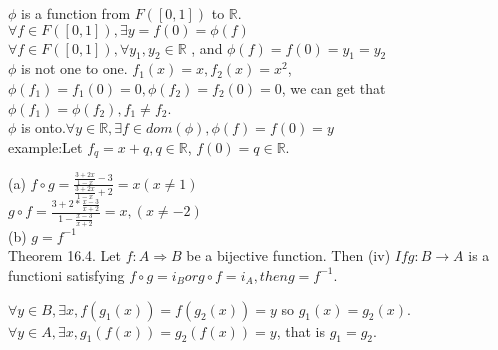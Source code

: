 \documentclass[a4paper, justified]{tufte-handout}
\begin{document}
\begin{problem}[UD Problem 15.15]
\end{problem}

\begin{solution}
	$\phi$ is a function from $F([0, 1])$ to $\mathbb{R}$.\\
	$\forall f \in F([0, 1]), \exists y = f(0) = \phi(f)$\\
	$\forall f \in F([0, 1]), \forall y_1, y_2 \in \mathbb{R}$ , and $\phi (f) = f(0) = y_1 = y_2$\\
	$\phi$ is not one to one. $f_1(x) = x, f_2(x) = x^2$, $\phi(f_1) = f_1(0) = 0, \phi(f_2) = f_2(0) = 0$, we can get that $\phi(f_1) = \phi(f_2), f_1 \neq f_2$.\\
	$\phi$ is onto.$\forall y \in \mathbb{R}, \exists f \in dom(\phi), \phi(f) = f(0) = y$\\
	example:Let $f_q = x + q, q \in \mathbb{R}$, $f(0) = q \in \mathbb{R} $.
\end{solution}

\begin{problem}[UD Problem 16.6]
\end{problem}

\begin{solution}
	(a) $f \circ g = \frac{\frac{3 + 2x}{1-x} - 3}{\frac{3 + 2x}{1-x} + 2} = x (x \neq 1)$\\
	$g\circ f = \frac{3 + 2 * \frac{x - 3}{x + 2}}{1 - \frac{x - 3}{x + 2}} = x, (x \neq -2)$\\
	(b) $g = f^{-1}$\\
	Theorem 16.4. Let $f:A \Rightarrow B$ be a bijective function. Then (iv) $If g: B \rightarrow A$ is a functioni satisfying $f \circ g = i_B or g \circ f = i_A, then g = f^{-1}.$
\end{solution}

\begin{problem}[UD Problem 16.14]
\end{problem}

\begin{solution}
	$\forall y \in B, \exists x, f(g_1(x)) = f(g_2(x)) = y$ so $g_1(x) = g_2(x).$\\
	$\forall y \in A, \exists x, g_1(f(x)) = g_2(f(x)) = y$, that is $g_1 = g_2.$\\
\end{solution}

\begin{problem}[UD Problem 16.17]
\end{problem}
\end{document}
